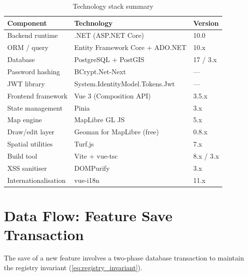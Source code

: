 \documentclass[12pt,a4paper]{article}
\theoremstyle{definition}
\theoremstyle{plain}
\theoremstyle{remark}
\begin{document}
\begin{table}[H]
\centering
\caption{Technology stack summary}
\label{tab:stack}
\begin{tabular}{lll}
\toprule
\textbf{Component} & \textbf{Technology} & \textbf{Version} \\
\midrule
Backend runtime        & .NET (ASP.NET Core)          & 10.0 \\
ORM / query            & Entity Framework Core + ADO.NET & 10.x \\
Database               & PostgreSQL + PostGIS          & 17 / 3.x \\
Password hashing       & BCrypt.Net-Next               & --- \\
JWT library            & System.IdentityModel.Tokens.Jwt & --- \\
Frontend framework     & Vue 3 (Composition API)       & 3.5.x \\
State management       & Pinia                         & 3.x \\
Map engine             & MapLibre GL JS                & 5.x \\
Draw/edit layer        & Geoman for MapLibre (free)    & 0.8.x \\
Spatial utilities      & Turf.js                       & 7.x \\
Build tool             & Vite + vue-tsc                & 8.x / 3.x \\
XSS sanitiser          & DOMPurify                     & 3.x \\
Internationalisation   & vue-i18n                      & 11.x \\
\bottomrule
\end{tabular}
\end{table}

\section{Data Flow: Feature Save Transaction}
\label{sec:save_transaction}

The save of a new feature involves a two-phase database transaction to
maintain the registry invariant (\cref{eq:registry_invariant}).
\end{document}
